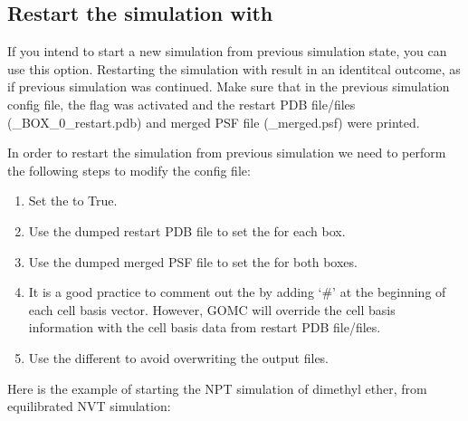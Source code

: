 \documentclass[letterpaper,10pt,english]{sphinxmanual}
\begin{document}
\subsection{Restart the simulation with }
\label{\detokenize{howto:restart-the-simulation-with-restart}}
\sphinxAtStartPar
If you intend to start a new simulation from previous simulation state, you can use this option. Restarting the simulation with   result in
an identitcal outcome, as if previous simulation was continued.
Make sure that in the previous simulation config file, the flag  was activated and the restart PDB file/files (\_BOX\_0\_restart.pdb)
and merged PSF file (\_merged.psf) were printed.

\sphinxAtStartPar
In order to restart the simulation from previous simulation we need to perform the following steps to modify the config file:
\begin{enumerate}
%
\item {} 
\sphinxAtStartPar
Set the  to True.

\item {} 
\sphinxAtStartPar
Use the dumped restart PDB file to set the  for each box.

\item {} 
\sphinxAtStartPar
Use the dumped merged PSF file to set the  for both boxes.

\item {} 
\sphinxAtStartPar
It is a good practice to comment out the  by adding ‘\#’ at the beginning of each cell basis vector. However, GOMC will override
the cell basis information with the cell basis data from restart PDB file/files.

\item {} 
\sphinxAtStartPar
Use the different  to avoid overwriting the output files.

\end{enumerate}

\sphinxAtStartPar
Here is the example of starting the NPT simulation of dimethyl ether, from equilibrated NVT simulation:
\end{document}
